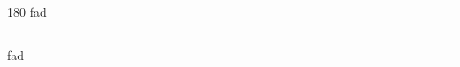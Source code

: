 
\begin{frame}
\begin{center}
\begin{turn}{180}
{\fontsize{2.5cm}{1em}\selectfont fad}
\end{turn}
\vspace{1em}\par  
\hrule
\vspace{1em}\par  
{\fontsize{2.5cm}{1em}\selectfont fad}
\end{center}
\end{frame}
